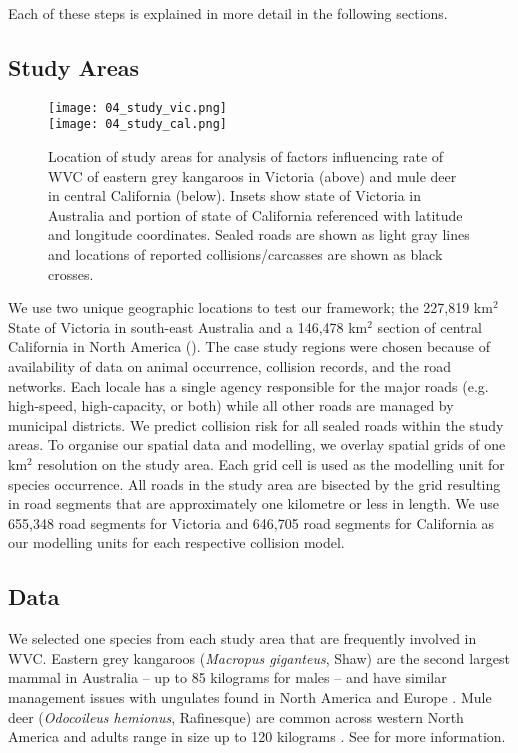 Each of these steps is explained in more detail in the following sections.

\subsection{Study Areas}

\begin{figure*}[!t]
  \centering
  \texttt{[image: 04\_study\_vic.png]}\\
  \texttt{[image: 04\_study\_cal.png]}
  \caption[Locations of WVC for eastern grey kangaroos in Victoria and mule deer in central California]{Location of study areas for analysis of factors influencing rate of WVC of eastern grey kangaroos in Victoria (above) and mule deer in central California (below). Insets show state of Victoria in Australia and portion of state of California referenced with latitude and longitude coordinates.  Sealed roads are shown as light gray lines and locations of reported collisions/carcasses are shown as black crosses.}
  \label{cal_study_area}
\end{figure*}

We use two unique geographic locations to test our framework; the 227,819 km$^2$ State of Victoria in south-east Australia and a 146,478 km$^2$ section of central California in North America (). The case study regions were chosen because of availability of data on animal occurrence, collision records, and the road networks. Each locale has a single agency responsible for the major roads (e.g. high-speed, high-capacity, or both) while all other roads are managed by municipal districts. We predict collision risk for all sealed roads within the study areas. To organise our spatial data and modelling, we overlay spatial grids of one km$^2$ resolution on the study area. Each grid cell is used as the modelling unit for species occurrence. All roads in the study area are bisected by the grid resulting in road segments that are approximately one kilometre or less in length. We use 655,348 road segments for Victoria and 646,705 road segments for California as our modelling units for each respective collision model.

\subsection{Data}

We selected one species from each study area that are frequently involved in WVC. Eastern grey kangaroos (\textit{Macropus giganteus}, Shaw) are the second largest mammal in Australia -- up to 85 kilograms for males \citep{vand08} -- and have similar management issues with ungulates found in North America and Europe \citep{crof04,coul10}.  Mule deer (\textit{Odocoileus hemionus}, Rafinesque) are common across western North America and adults range in size up to 120 kilograms \citep{kays09}. See  for more information.

